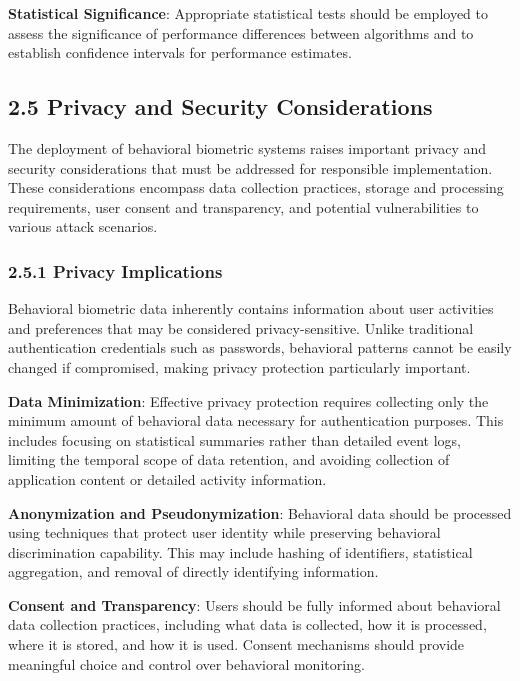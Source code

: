 \documentclass[
  11pt,
  a4paper,
]{article}
\begin{document}
\textbf{Statistical Significance}: Appropriate statistical tests should
be employed to assess the significance of performance differences
between algorithms and to establish confidence intervals for performance
estimates.

\subsection{2.5 Privacy and Security
Considerations}\label{privacy-and-security-considerations}

The deployment of behavioral biometric systems raises important privacy
and security considerations that must be addressed for responsible
implementation. These considerations encompass data collection
practices, storage and processing requirements, user consent and
transparency, and potential vulnerabilities to various attack scenarios.

\subsubsection{2.5.1 Privacy Implications}\label{privacy-implications}

Behavioral biometric data inherently contains information about user
activities and preferences that may be considered privacy-sensitive.
Unlike traditional authentication credentials such as passwords,
behavioral patterns cannot be easily changed if compromised, making
privacy protection particularly important.

\textbf{Data Minimization}: Effective privacy protection requires
collecting only the minimum amount of behavioral data necessary for
authentication purposes. This includes focusing on statistical summaries
rather than detailed event logs, limiting the temporal scope of data
retention, and avoiding collection of application content or detailed
activity information.

\textbf{Anonymization and Pseudonymization}: Behavioral data should be
processed using techniques that protect user identity while preserving
behavioral discrimination capability. This may include hashing of
identifiers, statistical aggregation, and removal of directly
identifying information.

\textbf{Consent and Transparency}: Users should be fully informed about
behavioral data collection practices, including what data is collected,
how it is processed, where it is stored, and how it is used. Consent
mechanisms should provide meaningful choice and control over behavioral
monitoring.
\end{document}
